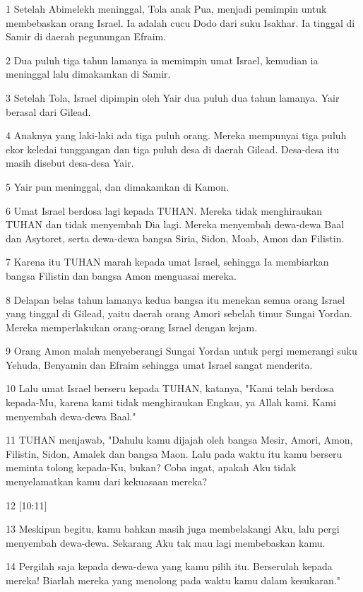 \par 1 Setelah Abimelekh meninggal, Tola anak Pua, menjadi pemimpin untuk membebaskan orang Israel. Ia adalah cucu Dodo dari suku Isakhar. Ia tinggal di Samir di daerah pegunungan Efraim.
\par 2 Dua puluh tiga tahun lamanya ia memimpin umat Israel, kemudian ia meninggal lalu dimakamkan di Samir.
\par 3 Setelah Tola, Israel dipimpin oleh Yair dua puluh dua tahun lamanya. Yair berasal dari Gilead.
\par 4 Anaknya yang laki-laki ada tiga puluh orang. Mereka mempunyai tiga puluh ekor keledai tunggangan dan tiga puluh desa di daerah Gilead. Desa-desa itu masih disebut desa-desa Yair.
\par 5 Yair pun meninggal, dan dimakamkan di Kamon.
\par 6 Umat Israel berdosa lagi kepada TUHAN. Mereka tidak menghiraukan TUHAN dan tidak menyembah Dia lagi. Mereka menyembah dewa-dewa Baal dan Asytoret, serta dewa-dewa bangsa Siria, Sidon, Moab, Amon dan Filistin.
\par 7 Karena itu TUHAN marah kepada umat Israel, sehingga Ia membiarkan bangsa Filistin dan bangsa Amon menguasai mereka.
\par 8 Delapan belas tahun lamanya kedua bangsa itu menekan semua orang Israel yang tinggal di Gilead, yaitu daerah orang Amori sebelah timur Sungai Yordan. Mereka memperlakukan orang-orang Israel dengan kejam.
\par 9 Orang Amon malah menyeberangi Sungai Yordan untuk pergi memerangi suku Yehuda, Benyamin dan Efraim sehingga umat Israel sangat menderita.
\par 10 Lalu umat Israel berseru kepada TUHAN, katanya, "Kami telah berdosa kepada-Mu, karena kami tidak menghiraukan Engkau, ya Allah kami. Kami menyembah dewa-dewa Baal."
\par 11 TUHAN menjawab, "Dahulu kamu dijajah oleh bangsa Mesir, Amori, Amon, Filistin, Sidon, Amalek dan bangsa Maon. Lalu pada waktu itu kamu berseru meminta tolong kepada-Ku, bukan? Coba ingat, apakah Aku tidak menyelamatkan kamu dari kekuasaan mereka?
\par 12 [10:11]
\par 13 Meskipun begitu, kamu bahkan masih juga membelakangi Aku, lalu pergi menyembah dewa-dewa. Sekarang Aku tak mau lagi membebaskan kamu.
\par 14 Pergilah saja kepada dewa-dewa yang kamu pilih itu. Berserulah kepada mereka! Biarlah mereka yang menolong pada waktu kamu dalam kesukaran."
